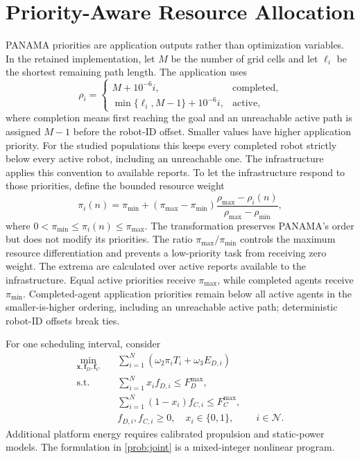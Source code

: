 \IfFileExists{IEEEtran.cls}{\documentclass[conference]{IEEEtran}}{\documentclass[10pt,twocolumn]{article}}
\newcommand{\Nset}{\mathcal{N}}
\begin{document}
\section{Priority-Aware Resource Allocation}
PANAMA priorities are application outputs rather than optimization variables.
In the retained implementation, let $M$ be the number of grid cells and let
$\ell_i$ be the shortest remaining path length. The application uses
\begin{equation}
\rho_i=\begin{cases}
M+10^{-6}i,&\text{completed},\\
\min\{\ell_i,M-1\}+10^{-6}i,&\text{active},
\end{cases}
\end{equation}
where completion means first reaching the goal and an unreachable active path is
assigned $M-1$ before the robot-ID offset.
Smaller values have higher application priority. For the studied populations this
keeps every completed robot strictly below every active robot, including an
unreachable one. The infrastructure applies this convention to available reports.
To let the infrastructure respond to those priorities, define the bounded resource weight
\begin{equation}
    \pi_i(n)=\pi_{\min}+(\pi_{\max}-\pi_{\min})
    \frac{\rho_{\max}-\rho_i(n)}{\rho_{\max}-\rho_{\min}},
    \label{eq:priority_weight}
\end{equation}
where $0<\pi_{\min}\leq\pi_i(n)\leq\pi_{\max}$. The transformation preserves PANAMA's order but does not modify its priorities. The ratio $\pi_{\max}/\pi_{\min}$ controls the maximum resource differentiation and prevents a low-priority task from receiving zero weight.
The extrema are calculated over active reports available to the infrastructure. Equal active priorities receive $\pi_{\max}$, while completed agents receive $\pi_{\min}$. Completed-agent application priorities remain below all active agents in the smaller-is-higher ordering, including an unreachable active path; deterministic robot-ID offsets break ties.

For one scheduling interval, consider
\begin{subequations}\label{prob:joint}
\begin{align}
\min_{\boldsymbol{x},\boldsymbol{f}_D,\boldsymbol{f}_C}\quad
&\sum_{i=1}^{N}\left(\omega_2\pi_iT_i+\omega_3E_{D,i}\right) \\
\mathrm{s.t.}\quad
&\sum_{i=1}^{N}x_if_{D,i}\leq F_D^{\max},\\
&\sum_{i=1}^{N}(1-x_i)f_{C,i}\leq F_C^{\max},\\
&f_{D,i},f_{C,i}\geq0,\quad x_i\in\{0,1\}, &&i\in\Nset.
\end{align}
\end{subequations}
Additional platform energy requires calibrated propulsion and static-power models. The formulation in \eqref{prob:joint} is a mixed-integer nonlinear program.
\end{document}
